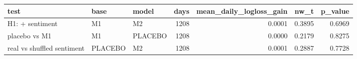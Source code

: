 \begin{tabular}{lllrrrr}
\toprule
test & base & model & days & mean\_daily\_logloss\_gain & nw\_t & p\_value \\
\midrule
H1: + sentiment & M1 & M2 & 1208 & 0.0001 & 0.3895 & 0.6969 \\
placebo vs M1 & M1 & PLACEBO & 1208 & 0.0000 & 0.2179 & 0.8275 \\
real vs shuffled sentiment & PLACEBO & M2 & 1208 & 0.0001 & 0.2887 & 0.7728 \\
\bottomrule
\end{tabular}
